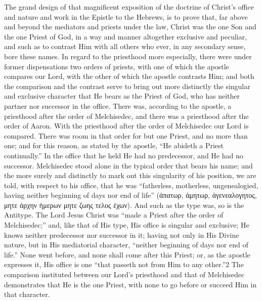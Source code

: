 \documentclass[]{book}
\begin{document}
The grand design of that magnificent exposition of the doctrine of Christ's office and nature and work in the Epistle to the Hebrews, is to prove that, far above and beyond the mediators and priests under the law, Christ was the one Son and the one Priest of God, in a way and manner altogether exclusive and peculiar, and such as to contrast Him with all others who ever, in any secondary sense, bore these names. In regard to the priesthood more especially, there were under former dispensations two orders of priests, with one of which the apostle compares our Lord, with the other of which the apostle contrasts Him; and both the comparison and the contrast serve to bring out more distinctly the singular and exclusive character that He bears as the Priest of God, who has neither partner nor successor in the office. There was, according to the apostle, a priesthood after the order of Melchisedec, and there was a priesthood after the order of Aaron. With the priesthood after the order of Melchisedec our Lord is compared. There was room in that order for but one Priest, and no more than one; and for this reason, as stated by the apostle, ``He abideth a Priest continually.'' In the office that he held He had no predecessor, and He had no successor. Melchisedec stood alone in the typical order that bears his name; and the more surely and distinctly to mark out this singularity of his position, we are told, with respect to his office, that he was ``fatherless, motherless, ungenealogied, having neither beginning of days nor end of life'' (ἀπατωρ, ἀμητωρ, ἀγενεαλογητος, μητε ἀρχην ἡμερων μητε ζωης τελος ἐχων). And such as the type was, so is the Antitype. The Lord Jesus Christ was ``made a Priest after the order of Melchisedec;'' and, like that of His type, His office is singular and exclusive; He knows neither predecessor nor successor in it; having not only in His Divine nature, but in His mediatorial character, ``neither beginning of days nor end of life.'' None went before, and none shall come after this Priest; or, as the apostle expresses it, His office is one ``that passeth not from Him to any other.''2 The comparison instituted between our Lord's priesthood and that of Melchisedec demonstrates that He is the one Priest, with none to go before or succeed Him in that character.
\end{document}

